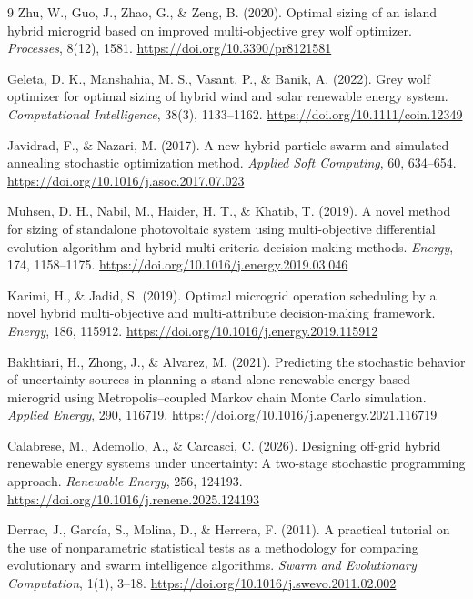 \documentclass[final,3p,times]{elsarticle}
\begin{document}
\begin{thebibliography}{9}
Zhu, W., Guo, J., Zhao, G., \& Zeng, B. (2020). Optimal sizing of an island hybrid microgrid based on improved multi-objective grey wolf optimizer. \textit{Processes}, 8(12), 1581. \url{https://doi.org/10.3390/pr8121581}

Geleta, D. K., Manshahia, M. S., Vasant, P., \& Banik, A. (2022). Grey wolf optimizer for optimal sizing of hybrid wind and solar renewable energy system. \textit{Computational Intelligence}, 38(3), 1133--1162. \url{https://doi.org/10.1111/coin.12349}

Javidrad, F., \& Nazari, M. (2017). A new hybrid particle swarm and simulated annealing stochastic optimization method. \textit{Applied Soft Computing}, 60, 634--654. \url{https://doi.org/10.1016/j.asoc.2017.07.023}

Muhsen, D. H., Nabil, M., Haider, H. T., \& Khatib, T. (2019). A novel method for sizing of standalone photovoltaic system using multi-objective differential evolution algorithm and hybrid multi-criteria decision making methods. \textit{Energy}, 174, 1158--1175. \url{https://doi.org/10.1016/j.energy.2019.03.046}

Karimi, H., \& Jadid, S. (2019). Optimal microgrid operation scheduling by a novel hybrid multi-objective and multi-attribute decision-making framework. \textit{Energy}, 186, 115912. \url{https://doi.org/10.1016/j.energy.2019.115912}

Bakhtiari, H., Zhong, J., \& Alvarez, M. (2021). Predicting the stochastic behavior of uncertainty sources in planning a stand-alone renewable energy-based microgrid using Metropolis--coupled Markov chain Monte Carlo simulation. \textit{Applied Energy}, 290, 116719. \url{https://doi.org/10.1016/j.apenergy.2021.116719}

Calabrese, M., Ademollo, A., \& Carcasci, C. (2026). Designing off-grid hybrid renewable energy systems under uncertainty: A two-stage stochastic programming approach. \textit{Renewable Energy}, 256, 124193. \url{https://doi.org/10.1016/j.renene.2025.124193}

Derrac, J., Garc\'{i}a, S., Molina, D., \& Herrera, F. (2011). A practical tutorial on the use of nonparametric statistical tests as a methodology for comparing evolutionary and swarm intelligence algorithms. \textit{Swarm and Evolutionary Computation}, 1(1), 3--18. \url{https://doi.org/10.1016/j.swevo.2011.02.002}


\end{thebibliography}
\end{document}
